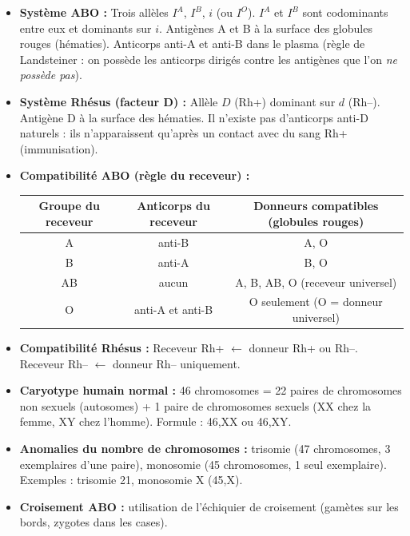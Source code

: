 \documentclass[11pt]{article}
\newcounter{popsec}
\newcounter{popsub}
\newcommand{\courssub}[1]{%
  \stepcounter{popsub}%
  \par\vspace{9pt}\noindent{\popxbold\fontsize{11.5}{13}\selectfont\color{popink}{\color{poporange}\thepopsec.\thepopsub}\hspace{6pt}#1}\par\nopagebreak\vspace{4pt}
}
\begin{document}
\courssub{Ressources à mobiliser}
\begin{itemize}
    \item \textbf{Système ABO :} Trois allèles $I^A$, $I^B$, $i$ (ou $I^O$). $I^A$ et $I^B$ sont codominants entre eux et dominants sur $i$. Antigènes A et B à la surface des globules rouges (hématies). Anticorps anti-A et anti-B dans le plasma (règle de Landsteiner : on possède les anticorps dirigés contre les antigènes que l'on \emph{ne possède pas}).
    \item \textbf{Système Rhésus (facteur D) :} Allèle $D$ (Rh+) dominant sur $d$ (Rh–). Antigène D à la surface des hématies. Il n'existe pas d'anticorps anti-D naturels : ils n'apparaissent qu'après un contact avec du sang Rh+ (immunisation).
    \item \textbf{Compatibilité ABO (règle du receveur) :}
    \begin{center}
    \begin{tabular}{|c|c|c|}\hline
    \rowcolor{popblueL}\textbf{Groupe du receveur} & \textbf{Anticorps du receveur} & \textbf{Donneurs compatibles (globules rouges)} \\ \hline
    A & anti-B & A, O \\ \hline
    B & anti-A & B, O \\ \hline
    AB & aucun & A, B, AB, O (receveur universel) \\ \hline
    O & anti-A et anti-B & O seulement (O = donneur universel) \\ \hline
    \end{tabular}
    \end{center}
    \item \textbf{Compatibilité Rhésus :} Receveur Rh+ $\leftarrow$ donneur Rh+ ou Rh–. Receveur Rh– $\leftarrow$ donneur Rh– uniquement.
    \item \textbf{Caryotype humain normal :} 46 chromosomes = 22 paires de chromosomes non sexuels (autosomes) + 1 paire de chromosomes sexuels (XX chez la femme, XY chez l'homme). Formule : 46,XX ou 46,XY.
    \item \textbf{Anomalies du nombre de chromosomes :} trisomie (47 chromosomes, 3 exemplaires d'une paire), monosomie (45 chromosomes, 1 seul exemplaire). Exemples : trisomie 21, monosomie X (45,X).
    \item \textbf{Croisement ABO :} utilisation de l'échiquier de croisement (gamètes sur les bords, zygotes dans les cases).
\end{itemize}
\end{document}
